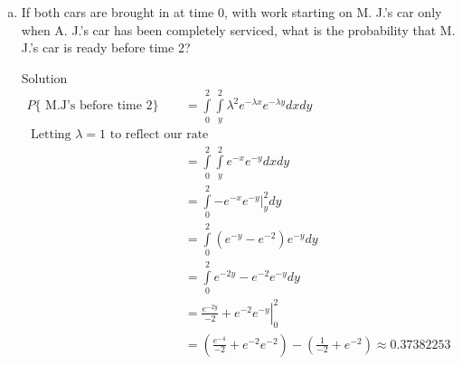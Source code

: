 \documentclass{article}
\begin{document}
\begin{spacing}{1.1}
\begin{homeworkProblem}
\begin{enumerate}[(a)]
\begin{homeworkSection}{Solution}
        Applying this to the problem, we first find the probabilty that
        A.J.'s car is finished at a time $\le t$.  During this time period, 
        the probability that M.J's care will be serviced is $0$.  Hence
          \begin{align*}
            P\{ \text{A.J.'s gets service} \le t\} &= \lambda \int\limits_0^t e^{-\lambda x} dx\\
            \text{ Letting $\lambda = 1$ to reflect our rate}\\
            &= \left. -e^{-x} \right|_0^t\\
            &= 1 - e^{-t}\\
          \end{align*}

        Now considering the probability that M.J.'s car will be serviced at a time $> t$,
        by the memorylessness of the exponential we find the the probability is $\frac{ 1}{2}$

        Putting everything together, we find that the probability M.J.'s car is serviced before
        A.J's car is
        \begin{align*}
          P\{ \text{ M.J's care is serviced before A.J.'s car} \} &= \left(\frac{ 1}{ 2}\right) (1 - e^{-t})\\
        \end{align*}
      \end{homeworkSection}
    \item If both cars are brought in at time 0, with work 
    starting on M. J.'s car only when A. J.'s car has been 
    completely serviced, what is the probability that M. J.'s 
    car is ready before time 2?
      \begin{homeworkSection}{Solution}
        \begin{align*}
          P\{ \text{ M.J's before time 2}\} 
          &= \int\limits_0^2 \int\limits_y^2 \lambda^2 e^{-\lambda x} e^{-\lambda y} dx dy\\
            \text{ Letting $\lambda = 1$ to reflect our rate}\\
          &= \int\limits_0^2 \int\limits_y^2 e^{-x} e^{-y} dx dy\\
          &= \int\limits_0^2 \left.-e^{-x} e^{-y}\right|_y^2 dy\\
          &= \int\limits_0^2 (e^{-y} - e^{-2}) e^{-y} dy\\
          &= \int\limits_0^2 e^{-2y} - e^{-2} e^{-y} dy\\
          &= \left.\frac{ e^{-2y}}{ -2} + e^{-2} e^{-y}\right|_0^2\\
          &= \left(\frac{ e^{-4}}{ -2} + e^{-2} e^{-2}\right) 
            - \left(\frac{ 1}{ -2} + e^{-2}\right)
        \approx 0.37382253
        \end{align*}
      \end{homeworkSection}
  \end{enumerate}
\end{homeworkProblem}


\end{spacing}
\end{document}
